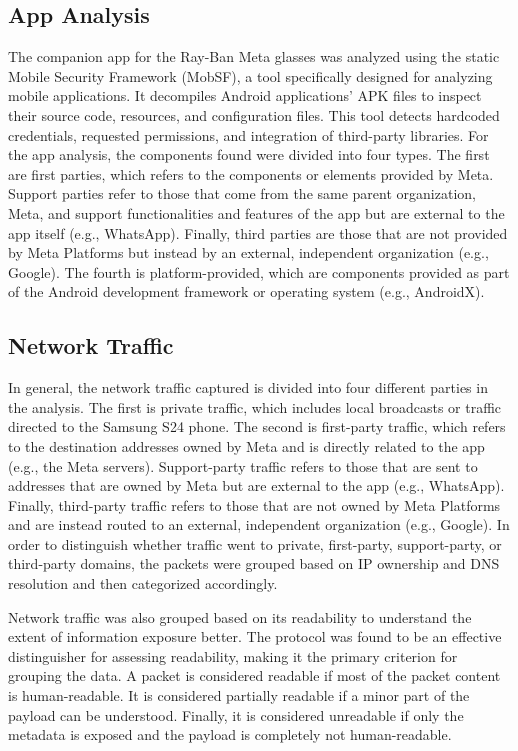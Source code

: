 \subsection*{App Analysis}
The companion app for the Ray-Ban Meta glasses was analyzed using the static Mobile Security Framework (MobSF), a tool specifically designed for analyzing mobile applications. It decompiles Android applications' APK files to inspect their source code, resources, and configuration files. This tool detects hardcoded credentials, requested permissions, and integration of third-party libraries. For the app analysis, the components found were divided into four types. The first are first parties, which refers to the components or elements provided by Meta. Support parties refer to those that come from the same parent organization, Meta, and support functionalities and features of the app but are external to the app itself (e.g., WhatsApp). Finally, third parties are those that are not provided by Meta Platforms but instead by an external, independent organization (e.g., Google). The fourth is platform-provided, which are components provided as part of the Android development framework or operating system (e.g., AndroidX).

\subsection*{Network Traffic}
\label{subsec:networkTraffic}
In general, the network traffic captured is divided into four different parties in the analysis. The first is private traffic, which includes local broadcasts or traffic directed to the Samsung S24 phone. The second is first-party traffic, which refers to the destination addresses owned by Meta and is directly related to the app (e.g., the Meta servers). Support-party traffic refers to those that are sent to addresses that are owned by Meta but are external to the app (e.g., WhatsApp). Finally, third-party traffic refers to those that are not owned by Meta Platforms and are instead routed to an external, independent organization (e.g., Google). In order to distinguish whether traffic went to private, first-party, support-party, or third-party domains, the packets were grouped based on IP ownership and DNS resolution and then categorized accordingly.

Network traffic was also grouped based on its readability to understand the extent of information exposure better. The protocol was found to be an effective distinguisher for assessing readability, making it the primary criterion for grouping the data. A packet is considered readable if most of the packet content is human-readable. It is considered partially readable if a minor part of the payload can be understood. Finally, it is considered unreadable if only the metadata is exposed and the payload is completely not human-readable.

